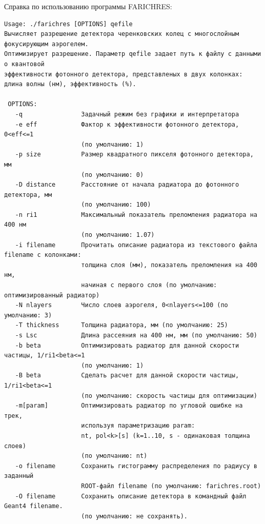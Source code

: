 \documentclass[12pt]{article}
\begin{document}
Справка по использованию программы FARICHRES:
{\small
\begin{verbatim}
Usage: ./farichres [OPTIONS] qefile
Вычисляет разрешение детектора черенковских колец с многослойным фокусирующим аэрогелем.
Оптимизирует разрешение. Параметр qefile задает путь к файлу с данными о квантовой
эффективности фотонного детектора, представленых в двух колонках: 
длина волны (нм), эффективность (%).

 OPTIONS:
   -q                Задачный режим без графики и интерпретатора
   -e eff            Фактор к эффективности фотонного детектора, 0<eff<=1 
                     (по умолчанию: 1)
   -p size           Размер квадратного пикселя фотонного детектора, мм 
                     (по умолчанию: 0)
   -D distance       Расстояние от начала радиатора до фотонного детектора, мм 
                     (по умолчанию: 100)
   -n ri1            Максимальный показатель преломления радиатора на 400 нм 
                     (по умолчанию: 1.07)
   -i filename       Прочитать описание радиатора из текстового файла filename с колонками:
                     толщина слоя (мм), показатель преломления на 400 нм,
                     начиная с первого слоя (по умолчанию: оптимизированный радиатор)
   -N nlayers        Число слоев аэрогеля, 0<nlayers<=100 (по умолчанию: 3)
   -T thickness      Толщина радиатора, мм (по умолчанию: 25)
   -s Lsc            Длина рассеяния на 400 нм, мм (по умолчанию: 50)
   -b beta           Оптимизировать радиатор для данной скорости частицы, 1/ri1<beta<=1
                     (по умолчанию: 1)
   -B beta           Сделать расчет для данной скорости частицы, 1/ri1<beta<=1 
                     (по умолчанию: скорость частицы для оптимизации)
   -m[param]         Оптимизировать радиатор по угловой ошибке на трек, 
                     используя параметризацию param:
                     nt, pol<k>[s] (k=1..10, s - одинаковая толщина слоев) 
                     (по умолчанию: nt)
   -o filename       Сохранить гистограмму распределения по радиусу в заданный 
                     ROOT-файл filename (по умолчанию: farichres.root)
   -O filename       Сохранить описание детектора в командный файл Geant4 filename.
                     (по умолчанию: не cохранять).
\end{verbatim}
}
\end{document}
